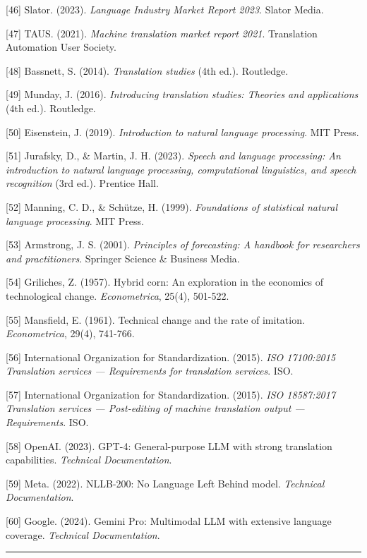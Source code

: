 \documentclass[12pt,a4paper]{article}
\begin{document}
{{{{{{[}46{]} Slator. (2023). \emph{Language Industry Market Report 2023}.
Slator Media.

{[}47{]} TAUS. (2021). \emph{Machine translation market report 2021}.
Translation Automation User Society.

{[}48{]} Bassnett, S. (2014). \emph{Translation studies} (4th ed.).
Routledge.

{[}49{]} Munday, J. (2016). \emph{Introducing translation studies:
Theories and applications} (4th ed.). Routledge.

{[}50{]} Eisenstein, J. (2019). \emph{Introduction to natural language
processing}. MIT Press.

{[}51{]} Jurafsky, D., \& Martin, J. H. (2023). \emph{Speech and
language processing: An introduction to natural language processing,
computational linguistics, and speech recognition} (3rd ed.). Prentice
Hall.

{[}52{]} Manning, C. D., \& Schütze, H. (1999). \emph{Foundations of
statistical natural language processing}. MIT Press.

{[}53{]} Armstrong, J. S. (2001). \emph{Principles of forecasting: A
handbook for researchers and practitioners}. Springer Science \&
Business Media.

{[}54{]} Griliches, Z. (1957). Hybrid corn: An exploration in the
economics of technological change. \emph{Econometrica}, 25(4), 501-522.

{[}55{]} Mansfield, E. (1961). Technical change and the rate of
imitation. \emph{Econometrica}, 29(4), 741-766.

{[}56{]} International Organization for Standardization. (2015).
\emph{ISO 17100:2015 Translation services --- Requirements for
translation services}. ISO.

{[}57{]} International Organization for Standardization. (2015).
\emph{ISO 18587:2017 Translation services --- Post-editing of machine
translation output --- Requirements}. ISO.

{[}58{]} OpenAI. (2023). GPT-4: General-purpose LLM with strong
translation capabilities. \emph{Technical Documentation}.

{[}59{]} Meta. (2022). NLLB-200: No Language Left Behind model.
\emph{Technical Documentation}.

{[}60{]} Google. (2024). Gemini Pro: Multimodal LLM with extensive
language coverage. \emph{Technical Documentation}.

\begin{center}\rule{0.5\linewidth}{0.5pt}\end{center}

}}}}}
\end{document}
